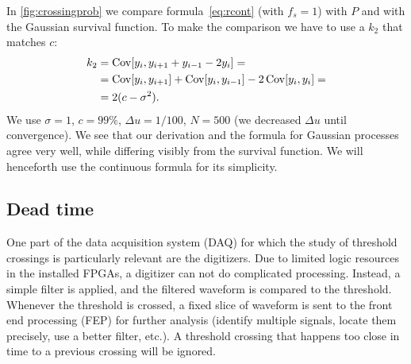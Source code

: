 In \autoref{fig:crossingprob} we compare formula~\eqref{eq:rcont} (with $f_s
= 1$) with $P$ and with the Gaussian survival function. To make the comparison
we have to use a $k_2$ that matches $c$:
%
\begin{align}
    k_2 &= \operatorname{Cov}[y_i, y_{i+1}+y_{i-1}-2y_i] = \notag \\
    &= \operatorname{Cov}[y_i,y_{i+1}]
    + \operatorname{Cov}[y_i,y_{i-1}]
    - 2 \operatorname{Cov}[y_i,y_i] = \notag \\
    &= 2 (c - \sigma^2). \label{eq:c2k2}
\end{align}
%
We use $\sigma=1$, $c = \SI{99}\%$, $\Delta u = 1/100$, $N=500$ (we decreased
$\Delta u$ until convergence). We see that our derivation and the formula
for Gaussian processes agree very well, while differing visibly from the
survival function. We will henceforth use the continuous formula for its
simplicity.

\begin{figure}
    

    
\end{figure}

\subsection{Dead time}

One part of the data acquisition system (DAQ) for which the study of threshold
crossings is particularly relevant are the digitizers. Due to limited logic
resources in the installed FPGAs, a digitizer can not do complicated
processing. Instead, a simple filter is applied, and the filtered waveform is
compared to the threshold. Whenever the threshold is crossed, a fixed slice of
waveform is sent to the front end processing (FEP) for further analysis
(identify multiple signals, locate them precisely, use a better filter, etc.).
A threshold crossing that happens too close in time to a previous crossing will
be ignored.

